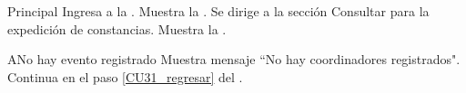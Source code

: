     \begin{UCtrayectoria}{Principal}
    \UCpaso[\UCactor] Ingresa a la .
    \UCpaso Muestra la . \label{CU31_regresar}
    \UCpaso[\UCactor] Se dirige a la sección Consultar para la expedición de constancias.  
    \UCpaso Muestra la . 
    \end{UCtrayectoria}
    
    \begin{UCtrayectoriaA}{A}{No hay evento registrado}
    	\UCpaso Muestra mensaje “No hay coordinadores registrados".
    	\UCpaso Continua en el paso \ref{CU31_regresar} del .
    \end{UCtrayectoriaA}


	


